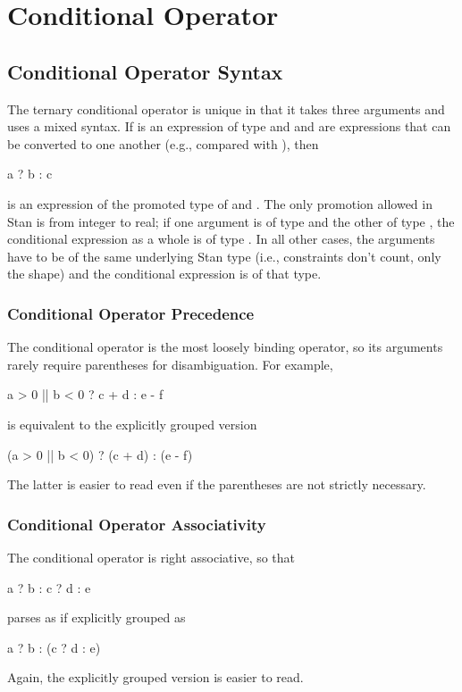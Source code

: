 \section{Conditional Operator}\label{conditional-operator.section}

\subsection{Conditional Operator Syntax}

The ternary conditional operator is unique in that it takes three
arguments and uses a mixed syntax.  If  is an expression of
type  and  and  are expressions that can be
converted to one another (e.g., compared with \code{==}), then
%
\begin{stancode}
a ? b : c
\end{stancode}
%
is an expression of the promoted type of  and .  The
only promotion allowed in Stan is from integer to real; if one
argument is of type  and the other of type , the
conditional expression as a whole is of type .  In all
other cases, the arguments have to be of the same underlying Stan type
(i.e., constraints don't count, only the shape) and the conditional
expression is of that type.

\subsubsection{Conditional Operator Precedence}

The conditional operator is the most loosely binding operator, so its
arguments rarely require parentheses for disambiguation.  For example,
%
\begin{stancode}
a > 0 || b < 0 ? c + d : e - f
\end{stancode}
%
is equivalent to the explicitly grouped version
%
\begin{stancode}
(a > 0 || b < 0) ? (c + d) : (e - f)
\end{stancode}
%
The latter is easier to read even if the parentheses are not strictly
necessary.

\subsubsection{Conditional Operator Associativity}

The conditional operator is right associative, so that
%
\begin{stancode}
a ? b : c ? d : e
\end{stancode}
%
parses as if explicitly grouped as
%
\begin{stancode}
a ? b : (c ? d : e)
\end{stancode}
%
Again, the explicitly grouped version is easier to read.


